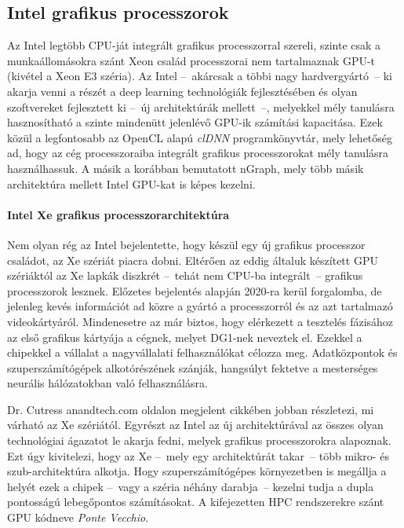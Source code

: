 \subsection{Intel grafikus processzorok}
Az Intel legtöbb CPU-ját integrált grafikus processzorral szereli, szinte csak a munkaállomásokra szánt Xeon család processzorai nem tartalmaznak GPU-t (kivétel a Xeon E3 széria).\cite{wiki:listOfIGPU} Az Intel --~akárcsak a többi nagy hardvergyártó~-- ki akarja venni a részét a deep learning technológiák  fejlesztésében és olyan szoftvereket fejlesztett ki --~új architektúrák mellett~--, melyekkel mély tanulásra hasznosítható a szinte mindenütt jelenlévő GPU-ik számítási kapacitása. Ezek közül a legfontosabb az OpenCL alapú \emph{clDNN} programkönyvtár, mely lehetőség ad, hogy az cég processzoraiba integrált grafikus processzorokat mély tanulásra használhassuk. A másik a korábban bemutatott nGraph, mely több másik architektúra mellett Intel GPU-kat is képes kezelni.

\paragraph{Intel Xe grafikus processzorarchitektúra}
Nem olyan rég az Intel bejelentette, hogy készül egy új grafikus processzor családot, az Xe szériát piacra dobni. Eltérően az eddig általuk készített GPU szériáktól az Xe lapkák diszkrét --~tehát nem CPU-ba integrált~-- grafikus processzorok lesznek. Előzetes bejelentés alapján 2020-ra kerül forgalomba, de jelenleg kevés információt ad közre a gyártó a processzorról és az azt tartalmazó videokártyáról.\cite{tyson-hexus} Mindenesetre az már biztos, hogy elérkezett a tesztelés fázisához az első grafikus kártyája a cégnek, melyet DG1-nek neveztek el.\cite{allan-techradar} Ezekkel a chipekkel a vállalat a nagyvállalati felhasználókat célozza meg. Adatközpontok és szuperszámítógépek alkotórészének szánják, hangsúlyt fektetve a mesterséges neurális hálózatokban való felhasználásra.

Dr. Cutress anandtech.com oldalon megjelent cikkében jobban részletezi, mi várható az Xe szériától.\cite{cutress-anandtech} Egyrészt az Intel az új architektúrával az összes olyan technológiai ágazatot le akarja fedni, melyek grafikus processzorokra alapoznak. Ezt úgy kivitelezi, hogy az Xe --~mely egy architektúrát takar~-- több mikro- és szub-architektúra alkotja.
Hogy szuperszámítógépes környezetben is megállja a helyét ezek a chipek --~vagy a széria néhány darabja~-- kezelni tudja a dupla pontosságú lebegőpontos számításokat. A kifejezetten HPC rendszerekre szánt GPU kódneve \emph{Ponte Vecchio}.

